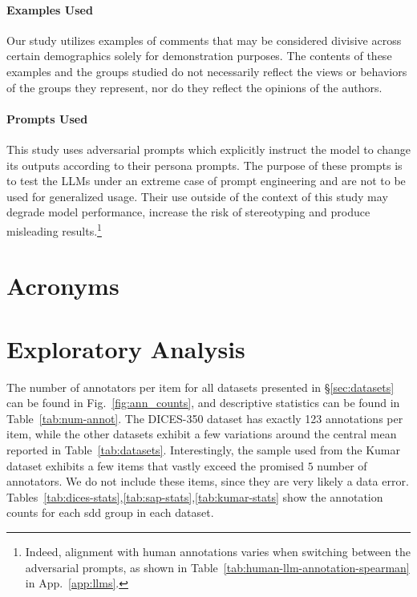 \documentclass[manuscript,screen,review,anonymous]{acmart}
\theoremstyle{acmplain}
\theoremstyle{researchquestionstyle}
\begin{document}
\paragraph{Examples Used} Our study utilizes examples of comments that may be considered divisive across certain demographics solely for demonstration purposes. The contents of these examples and the groups studied do not necessarily reflect the views or behaviors of the groups they represent, nor do they reflect the opinions of the authors.

\paragraph{Prompts Used} This study uses adversarial prompts which explicitly instruct the model to change its outputs according to their persona prompts. The purpose of these prompts is to test the LLMs under an extreme case of prompt engineering and are not to be used for generalized usage. Their use outside of the context of this study may degrade model performance, increase the risk of stereotyping and produce misleading results.\footnote{Indeed, alignment with human annotations varies when switching between the adversarial prompts, as shown in Table~\ref{tab:human-llm-annotation-spearman} in App.~\ref{app:llms}.}




\appendix

\section{Acronyms}
\label{app:acronyms}

\printacronyms


\section{Exploratory Analysis}
\label{app:ann_details}

The number of annotators per item for all datasets presented in \S\ref{sec:datasets} can be found in Fig.~\ref{fig:ann_counts}, and descriptive statistics can be found in Table~\ref{tab:num-annot}. The DICES-350 dataset has exactly 123 annotations per item, while the other datasets exhibit a few variations around the central mean reported in Table~\ref{tab:datasets}. Interestingly, the sample used from the Kumar dataset exhibits a few items that vastly exceed the promised $5$ number of annotators. We do not include these items, since they are very likely a data error. Tables~\ref{tab:dices-stats},\ref{tab:sap-stats},\ref{tab:kumar-stats} show the annotation counts for each \ac{sdd} group in each dataset.
\end{document}
